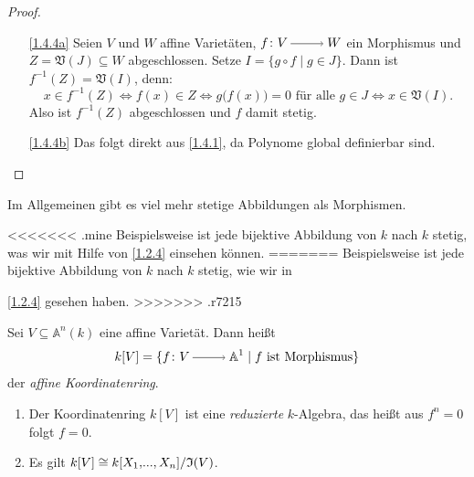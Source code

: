 \documentclass[a4paper,12pt,index=toc]{scrbook}
\theoremstyle{keinenummern} %
\def\A{\mathbb{A}}
\def\V{\mathfrak{V}}
\def\I{\mathfrak{I}}
\renewcommand{\dotsc}{\ensuremath{\!...}}
\newcommand{\polyx}[1][n]{\ensuremath%
  [X_{1},\dotsc,X_{#1}]}
\begin{document}
\begin{proof}
\begin{enumerate}
\item[\ref{1.4.4a}] Seien $V$ und $W$ affine Varietäten, $f\colon V\ra W$ ein Morphismus und $Z=\V(J)\subseteq W$ abgeschlossen. Setze $I=\{g\circ f \mid g\in J\}$. Dann ist $f^{-1}(Z)=\V(I)$, denn: 
\begin{equation*}x\in f^{-1}(Z)\iff f(x)\in Z \iff g\bigl(f(x)\bigr)=0\text{ für alle }g\in J\iff x\in\V(I).\end{equation*}
Also ist $f^{-1}(Z)$ abgeschlossen und $f$ damit stetig.
\item[\ref{1.4.4b}] Das folgt direkt aus \cref{1.4.1}, da Polynome global definierbar sind.
\end{enumerate}
\end{proof}

\begin{w}
Im Allgemeinen gibt es viel mehr stetige Abbildungen als Morphismen. 

<<<<<<< .mine
Beispielsweise ist jede bijektive Abbildung von $k$ nach $k$   stetig, was wir mit Hilfe von \cref{1.2.4} einsehen können.
=======
Beispielsweise ist jede bijektive Abbildung von $k$ nach $k$   stetig, wie wir in\par \cref{1.2.4} gesehen haben.
>>>>>>> .r7215

\end{w}\par

\begin{dfn}\label{1.4.5}
Sei $V\subseteq \A^n(k)$ eine affine Varietät. Dann heißt 
\begin{equation*}k[V]=\{f\colon V\ra \A^{1} \mid f\text{ ist Morphismus\}}\end{equation*}
 der \emph{affine Koordinatenring}.
\end{dfn}

\begin{bem}
\begin{enumerate}
\item{} Der Koordinatenring $k[V]$ ist eine \emph{reduzierte} $k$-Algebra, das heißt aus $f^n=0$ folgt $f=0$.
\item{} Es gilt $k[V] \cong \Quotient{k\polyx}{\I(V)}$.
\end{enumerate}
\end{bem}
\end{document}
